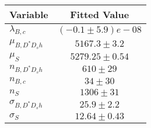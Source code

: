 \begin{tabular}[t]{lc}
\hline
Variable &Fitted Value\\
\hline\hline
$\lambda_{B,c}$&$(-0.1\pm5.9)e-08$\\
\hline
$\mu_{B, D^* D_s h}$&$5167.3\pm3.2$\\
\hline
$\mu_S$&$5279.25\pm0.54$\\
\hline
$n_{B, D^* D_s h}$&$610\pm29$\\
\hline
$n_{B,c}$&$34\pm30$\\
\hline
$n_S$&$1306\pm31$\\
\hline
$\sigma_{B, D^* D_s h}$&$25.9\pm2.2$\\
\hline
$\sigma_S$&$12.64\pm0.43$\\
\hline
\end{tabular}